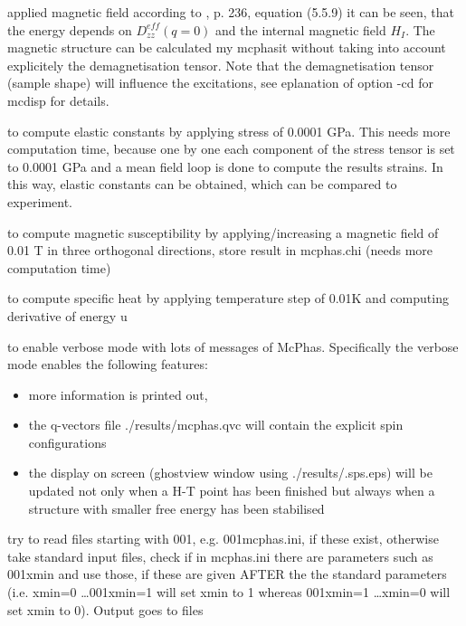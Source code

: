 \begin{description}
applied magnetic field according to \cite{jensen91-1}, p. 236, equation (5.5.9) it can
be seen, that the energy depends on $D^{eff}_{zz}(q=0)$ and the internal magnetic field
$H_I$. The magnetic structure can be calculated my {\prg mcphasit} without taking into account explicitely the
demagnetisation tensor. Note that the demagnetisation tensor (sample shape)
will influence the excitations, see eplanation of option -cd for
{\prg mcdisp} for details.
\item[\prg  -cel  0.0001] to compute elastic constants by applying stress of 0.0001 GPa. This needs more computation
     time, because one by one each component of the stress tensor is set to 0.0001 GPa and a mean field loop is done
     to compute the results strains. In this way, elastic constants can be obtained, which can be compared to experiment.
\item[\prg  -chi  0.01] to compute magnetic susceptibility by applying/increasing a magnetic field of 0.01 T 
                   in three orthogonal directions, store result in mcphas.chi  (needs more computation time)
\item[\prg   -cv  0.01]   to compute specific heat by applying temperature step of 0.01K and computing derivative of energy u         
\item[\prg   -v]  to  enable verbose mode with lots of messages of {\prg McPhas}. Specifically
the verbose mode enables the following features:
  \begin{itemize}
			          \item more information is printed out, 
			          \item the q-vectors file {\prg ./results/mcphas.qvc} will contain 
				    the explicit spin configurations
			          \item the display on screen (ghostview window using 
				     {\prg ./results/.sps.eps}) will be updated not only 
				    when a H-T point has been finished but always 
				    when a structure with smaller free energy 
				    has been stabilised
  \end{itemize}
 \item[\prg    -prefix 001  ]  try to read files starting with 001, e.g.
 		    001mcphas.ini, if these exist, otherwise take
 		    standard input files, check if in mcphas.ini there are
                   parameters such as 001xmin and use those, if these are given AFTER the 
                   the standard parameters (i.e. xmin=0 \dots 001xmin=1 will set xmin to 1 whereas
              001xmin=1 \dots xmin=0 will set xmin to 0). Output goes to files

\end{description}

